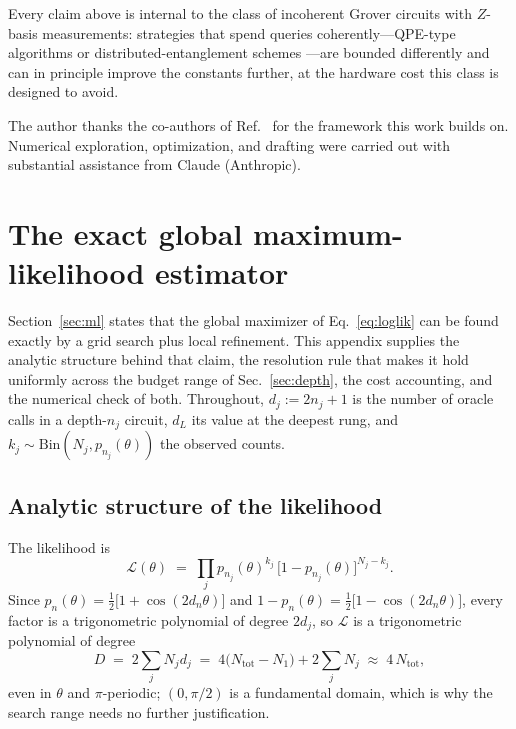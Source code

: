 \documentclass[%
 twocolumn,
 amsmath,amssymb,
prx,
longbibliography
]{revtex4-2}
\newcommand{\Ntot}{N_{\mathrm{tot}}}
\begin{document}
Every claim above is internal to the class of incoherent Grover circuits with $Z$-basis measurements: strategies that spend queries coherently---\ac{QPE}-type algorithms or distributed-entanglement schemes \cite{oshio2025near}---are bounded differently and can in principle improve the constants further, at the hardware cost this class is designed to avoid.

\begin{acknowledgments}
The author thanks the co-authors of Ref.~\cite{labib2024csae} for the framework this work builds on. Numerical exploration, optimization, and drafting were carried out with substantial assistance from Claude (Anthropic).
\end{acknowledgments}



\appendix

\section{The exact global maximum-likelihood estimator}\label{app:ml}

Section~\ref{sec:ml} states that the global maximizer of Eq.~\eqref{eq:loglik} can be found exactly by a grid search plus local refinement. This appendix supplies the analytic structure behind that claim, the resolution rule that makes it hold uniformly across the budget range of Sec.~\ref{sec:depth}, the cost accounting, and the numerical check of both. Throughout, $d_j := 2n_j + 1$ is the number of oracle calls in a depth-$n_j$ circuit, $d_L$ its value at the deepest rung, and $k_j \sim \mathrm{Bin}(N_j, p_{n_j}(\theta))$ the observed counts.

\subsection{Analytic structure of the likelihood}\label{app:structure}

The likelihood is
\begin{equation}\label{eq:lik}
    \mathcal{L}(\theta) \;=\; \prod_j p_{n_j}(\theta)^{k_j}\,\big[1 - p_{n_j}(\theta)\big]^{N_j - k_j}.
\end{equation}
Since $p_n(\theta) = \tfrac12\big[1 + \cos(2 d_n \theta)\big]$ and $1 - p_n(\theta) = \tfrac12\big[1 - \cos(2 d_n\theta)\big]$, every factor is a trigonometric polynomial of degree $2d_j$, so $\mathcal{L}$ is a trigonometric polynomial of degree
\begin{equation}\label{eq:degree}
    D \;=\; 2\sum_j N_j d_j \;=\; 4\big(\Ntot - N_1\big) + 2\sum_j N_j \;\approx\; 4\,\Ntot ,
\end{equation}
even in $\theta$ and $\pi$-periodic; $(0, \pi/2)$ is a fundamental domain, which is why the search range needs no further justification.
\end{document}
